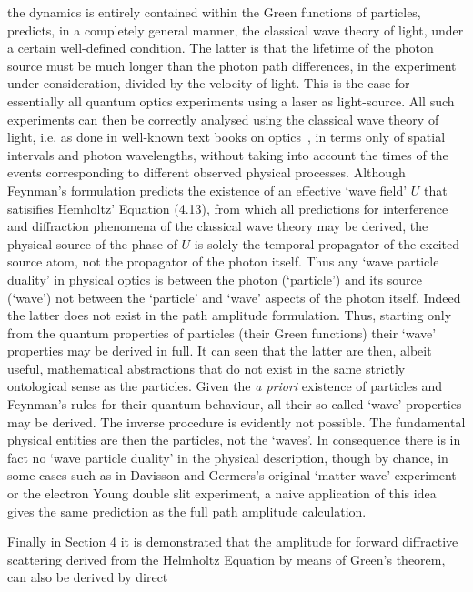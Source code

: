 {   the dynamics is entirely contained within the Green functions of particles, predicts, in
   a completely general manner, the classical wave theory of light, under a certain well-defined
   condition. The latter is that the lifetime of the photon source must be much
    longer than the photon path differences, in the experiment under consideration,
    divided by the velocity of light. This is the case for essentially all 
   quantum optics experiments using  a laser as light-source. All such experiments
   can then be correctly analysed using the classical wave theory of light, i.e. as done in well-known
    text books on optics~\cite{BW1,MW1}, in terms only
   of spatial intervals and photon wavelengths, without taking into account the times of
    the events corresponding to different observed physical processes. 
    Although Feynman's formulation predicts the existence of an effective `wave field' $U$
    that satisifies Hemholtz' Equation (4.13), from which all predictions for interference and diffraction
   phenomena of the classical wave theory may be derived, the physical source
  of the phase of $U$ is solely the temporal propagator of the excited source atom, not the
  propagator of the photon itself. Thus any `wave particle duality' in physical optics is
  between the photon (`particle') and its source (`wave') not between the `particle' and
  `wave' aspects of the photon itself. Indeed the latter does not exist in 
   the path amplitude formulation. Thus, starting only from the quantum 
   properties of particles (their Green functions) their `wave' properties may be
    derived in full. It can seen that the latter are then, albeit useful, mathematical abstractions
  that do not exist in the same strictly ontological sense as the particles.
   Given the {\it a priori} existence of particles and Feynman's rules for their
  quantum behaviour, all their so-called `wave' properties may be derived. The inverse procedure
  is evidently not possible. The fundamental physical entities are then the particles,
  not the `waves'. In consequence there is in fact no `wave particle duality' in the physical 
  description, though by chance, in some cases such as in Davisson and Germers's original `matter wave'
  experiment~\cite{DG} or the electron Young double slit experiment, a naive application
  of this idea gives the same prediction as the full path amplitude calculation.
   \par Finally in Section 4 it is demonstrated that the amplitude for forward diffractive scattering
    derived from the Helmholtz Equation by means of Green's theorem, can also be derived by direct
}
